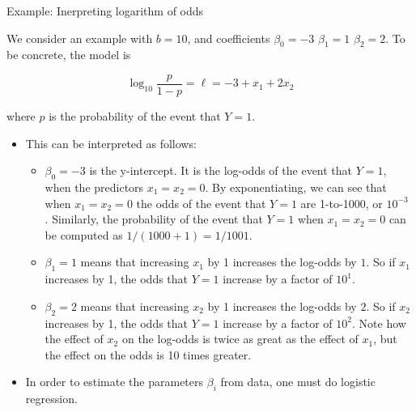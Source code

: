 \documentclass[11pt,dvipsnames,ignorenonframetext,aspectratio=169]{beamer}
\providecommand{\tightlist}{%
  \setlength{\itemsep}{0pt}\setlength{\parskip}{0pt}}
\begin{document}
\begin{frame}{Example: Inerpreting logarithm of odds}
\protect\hypertarget{example-inerpreting-logarithm-of-odds}{}

We consider an example with \({\displaystyle b=10}\), and coefficients
\({\displaystyle \beta _{0}=-3}\) \({\displaystyle \beta _{1}=1}\)
\({\displaystyle \beta _{2}=2}\). To be concrete, the model is

\[
{\displaystyle \log _{10}{\frac {p}{1-p}}=\ell =-3+x_{1}+2x_{2}}
\]

where \({\displaystyle p}\) is the probability of the event that
\({\displaystyle Y=1}\).

\end{frame}

\begin{frame}{}
\protect\hypertarget{section-5}{}

\begin{itemize}
\tightlist
\item
  This can be interpreted as follows:

  \begin{itemize}
  \tightlist
  \item
    \({\displaystyle \beta _{0}=-3}\) is the y-intercept. It is the
    log-odds of the event that \({\displaystyle Y=1}\), when the
    predictors \({\displaystyle x_{1}=x_{2}=0}\). By exponentiating, we
    can see that when \({\displaystyle x_{1}=x_{2}=0}\) the odds of the
    event that \({\displaystyle Y=1}\) are 1-to-1000, or
    \({\displaystyle 10^{-3}}\) . Similarly, the probability of the
    event that \({\displaystyle Y=1}\) when
    \({\displaystyle x_{1}=x_{2}=0}\) can be computed as
    \({\displaystyle 1/(1000+1)=1/1001}\).
  \item
    \({\displaystyle \beta _{1}=1}\) means that increasing
    \({\displaystyle x_{1}}\) by 1 increases the log-odds by
    \({\displaystyle 1}\). So if \({\displaystyle x_{1}}\) increases by
    1, the odds that \({\displaystyle Y=1}\) increase by a factor of
    \({\displaystyle 10^{1}}\).
  \item
    \({\displaystyle \beta _{2}=2}\) means that increasing
    \({\displaystyle x_{2}}\) by 1 increases the log-odds by
    \({\displaystyle 2}\). So if \({\displaystyle x_{2}}\) increases by
    1, the odds that \({\displaystyle Y=1}\) increase by a factor of
    \({\displaystyle 10^{2}.}\) Note how the effect of
    \({\displaystyle x_{2}}\) on the log-odds is twice as great as the
    effect of \({\displaystyle x_{1}}\), but the effect on the odds is
    10 times greater.
  \end{itemize}
\item
  In order to estimate the parameters \({\displaystyle \beta _{i}}\)
  from data, one must do logistic regression.
\end{itemize}

\end{frame}
\end{document}
